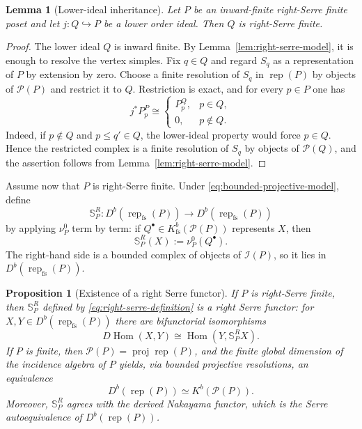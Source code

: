 \documentclass[10pt,a4paper]{amsart}
\newtheorem{proposition}[theorem]{Proposition}
\newtheorem{lemma}[theorem]{Lemma}
\newcommand{\Rep}{\operatorname{rep}}
\newcommand{\Hom}{\operatorname{Hom}}
\begin{document}
\begin{lemma}[Lower-ideal inheritance]
\label{lem:right-serre-lower-ideal}
Let $P$ be an inward-finite right-Serre finite poset and let
$j:Q\hookrightarrow P$ be a lower order ideal.  Then $Q$ is right-Serre
finite.
\end{lemma}

\begin{proof}
The lower ideal $Q$ is inward finite.  By
Lemma~\ref{lem:right-serre-model}, it is enough to resolve the vertex simples.
Fix $q\in Q$ and regard $S_q$ as a representation of $P$ by extension by
zero.  Choose a finite resolution of $S_q$ in $\Rep(P)$ by objects of
$\mathcal P(P)$ and restrict it to $Q$.  Restriction is exact, and for every
$p\in P$ one has
\[
j^*P_p^P\cong
\begin{cases}
P_p^Q,&p\in Q,\\
0,&p\notin Q.
\end{cases}
\]
Indeed, if $p\notin Q$ and $p\le q'\in Q$, the lower-ideal property would
force $p\in Q$.  Hence the restricted complex is a finite resolution of
$S_q$ by objects of $\mathcal P(Q)$, and the assertion follows from
Lemma~\ref{lem:right-serre-model}.
\end{proof}

Assume now that $P$ is right-Serre finite.  Under
\eqref{eq:bounded-projective-model}, define
\[
\mathbb S_P^R:
D^b(\Rep_{\mathrm{fs}}(P))
\longrightarrow
D^b(\Rep_{\mathrm{fs}}(P))
\]
by applying $\nu_P^0$ term by term: if $Q^\bullet\in
K^b_{\mathrm{fs}}(\mathcal P(P))$ represents $X$, then
\begin{equation}\label{eq:right-serre-definition}
\mathbb S_P^R(X):=\nu_P^0(Q^\bullet).
\end{equation}
The right-hand side is a bounded complex of objects of $\mathcal I(P)$, so it
lies in $D^b(\Rep_{\mathrm{fs}}(P))$.

\begin{proposition}[Existence of a right Serre functor]
\label{prop:right-serre-existence}
If $P$ is right-Serre finite, then $\mathbb S_P^R$ defined by
\eqref{eq:right-serre-definition} is a right Serre functor: for
$X,Y\in D^b(\Rep_{\mathrm{fs}}(P))$ there are bifunctorial isomorphisms
\[
D\Hom(X,Y)\cong\Hom(Y,\mathbb S_P^R X).
\]
If $P$ is finite, then $\mathcal P(P)=\operatorname{proj}\Rep(P)$, and
the finite global dimension of the incidence algebra of $P$ yields, via
bounded projective resolutions, an equivalence
\[
D^b(\Rep(P))\simeq K^b(\mathcal P(P)).
\]
Moreover, $\mathbb S_P^R$ agrees with the derived Nakayama functor, which is
the Serre autoequivalence of $D^b(\Rep(P))$.
\end{proposition}
\end{document}
